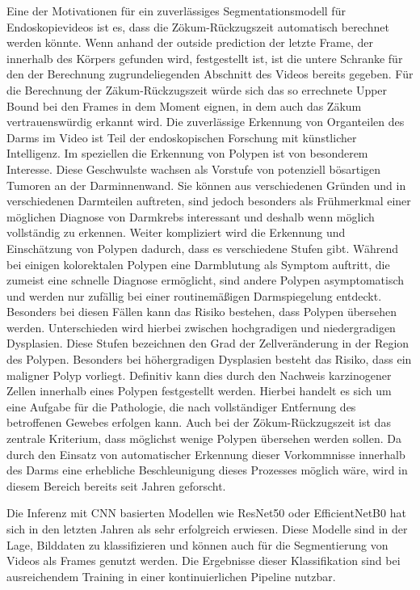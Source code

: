 Eine der Motivationen für ein zuverlässiges Segmentationsmodell für Endoskopievideos ist es, 
dass die Zökum-Rückzugszeit automatisch berechnet werden könnte. Wenn anhand der outside prediction der letzte Frame, 
der innerhalb des Körpers gefunden wird, festgestellt ist, ist die untere Schranke für den der Berechnung zugrundeliegenden Abschnitt des 
Videos bereits gegeben. Für die Berechnung der Zäkum-Rückzugszeit würde sich das so errechnete Upper Bound bei den Frames in dem Moment eignen, 
in dem auch das Zäkum vertrauenswürdig erkannt wird. Die zuverlässige Erkennung von Organteilen des Darms im Video ist 
Teil der endoskopischen Forschung mit künstlicher Intelligenz. Im speziellen die Erkennung von Polypen ist von besonderem Interesse. 
Diese Geschwulste wachsen als Vorstufe von potenziell bösartigen Tumoren an der Darminnenwand. Sie können aus verschiedenen Gründen und in verschiedenen Darmteilen auftreten, 
sind jedoch besonders als Frühmerkmal einer möglichen Diagnose von Darmkrebs interessant und deshalb wenn möglich vollständig zu erkennen. \citep{doi:10.7326/0003-4819-157-4-201208210-00002}
Weiter kompliziert wird die Erkennung und Einschätzung von Polypen dadurch, dass es verschiedene Stufen gibt.
Während bei einigen kolorektalen Polypen eine Darmblutung als Symptom auftritt, die zumeist eine schnelle Diagnose ermöglicht, sind andere Polypen asymptomatisch und werden nur zufällig bei einer routinemäßigen Darmspiegelung entdeckt.
Besonders bei diesen Fällen kann das Risiko bestehen, dass Polypen übersehen werden.
Unterschieden wird hierbei zwischen hochgradigen und niedergradigen Dysplasien. Diese Stufen bezeichnen den Grad der Zellveränderung in der Region des Polypen.
Besonders bei höhergradigen Dysplasien besteht das Risiko, dass ein maligner Polyp vorliegt.
Definitiv kann dies durch den Nachweis karzinogener Zellen innerhalb eines Polypen festgestellt werden. Hierbei handelt es sich um eine Aufgabe für die Pathologie,
die nach vollständiger Entfernung des betroffenen Gewebes erfolgen kann. \citep{Colucci261}
Auch bei der Zökum-Rückzugszeit ist das zentrale Kriterium, dass möglichst wenige Polypen übersehen werden sollen. 
Da durch den Einsatz von automatischer Erkennung dieser Vorkommnisse innerhalb des Darms eine erhebliche Beschleunigung dieses 
Prozesses möglich wäre, wird in diesem Bereich bereits seit Jahren geforscht. \citep{talukder-2022} 

Die Inferenz mit CNN basierten Modellen wie ResNet50 oder EfficientNetB0 hat sich in den letzten Jahren als sehr erfolgreich erwiesen.
Diese Modelle sind in der Lage, Bilddaten zu klassifizieren und können auch für die Segmentierung von Videos als Frames genutzt werden.
Die Ergebnisse dieser Klassifikation sind bei ausreichendem Training in einer kontinuierlichen Pipeline nutzbar.

